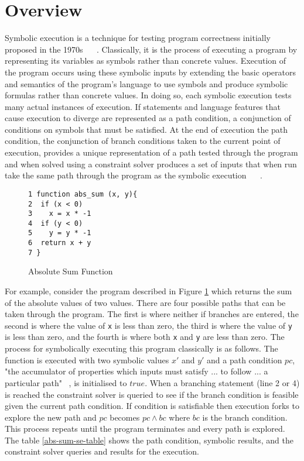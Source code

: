 \documentclass[]{final_report}
\begin{document}
\section{Overview}

Symbolic execution is a technique for testing program correctness initially proposed in the 1970s ~\cite{king1976symbolic} ~\cite{boyer1975select}. Classically, it is the process of executing a program by representing its variables as symbols rather than concrete values. Execution of the program occurs using these symbolic inputs by extending the basic operators and semantics of the program's language to use symbols and produce symbolic formulas rather than concrete values. In doing so, each symbolic execution tests many actual instances of execution. If statements and language features that cause execution to diverge are represented as a path condition, a conjunction of conditions on symbols that must be satisfied. At the end of execution the path condition, the conjunction of branch conditions taken to the current point of execution, provides a unique representation of a path tested through the program and when solved using a constraint solver produces a set of inputs that when run take the same path through the program as the symbolic execution ~\cite{godefroid2008automated} ~\cite{godefroid2005dart}.

\begin{figure}[h]
\begin{lstlisting}
1 function abs_sum (x, y){
2  if (x < 0)
3    x = x * -1
4  if (y < 0)
5    y = y * -1
6  return x + y
7 }
\end{lstlisting}
\caption{\label{fig:abs-sum} Absolute Sum Function}
\end{figure} 

For example, consider the program described in Figure \ref{fig:abs-sum} which returns the sum of the absolute values of two values. There are four possible paths that can be taken through the program. The first is where neither if branches are entered, the second is where the value of \lstinline{x}  is less than zero, the third is where the value of \lstinline{y}  is less than zero, and the fourth is where both \lstinline{x}  and \lstinline{y} are less than zero. The process for symbolically executing this program classically is as follows. The function is executed with two symbolic values $x'$ and $y'$ and a path condition $pc$, "the accumulator of properties which inputs must satisfy ... to follow ... a particular path" ~\cite{king1976symbolic}, is initialised to $true$. When a branching statement (line 2 or 4) is reached the constraint solver is queried to see if the branch condition is feasible given the current path condition. If condition is satisfiable then execution forks to explore the new path and $pc$ becomes $pc \land bc$  where $bc$ is the branch condition. This process repeats until the program terminates and every path is explored. The table \ref{abs-sum-se-table} shows the path condition, symbolic results, and the constraint solver queries and results for the execution.
\end{document}
